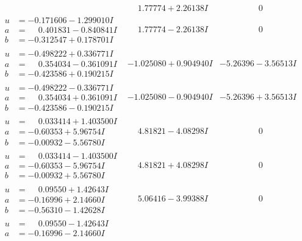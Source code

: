 \documentclass[1p]{elsarticle_modified}
\theoremstyle{definition}
\begin{document}
$$\begin{array}{c|c|c}
 & \phantom{-}1.77774 + 2.26138 I & \phantom{-0.000000 } 0 \\ \hline\begin{aligned}
u &= -0.171606 - 1.299010 I \\
a &= \phantom{-}0.401831 - 0.840841 I \\
b &= -0.312547 + 0.178701 I\end{aligned}
 & \phantom{-}1.77774 - 2.26138 I & \phantom{-0.000000 } 0 \\ \hline\begin{aligned}
u &= -0.498222 + 0.336771 I \\
a &= \phantom{-}0.354034 - 0.361091 I \\
b &= -0.423586 + 0.190215 I\end{aligned}
 & -1.025080 + 0.904940 I & -5.26396 - 3.56513 I \\ \hline\begin{aligned}
u &= -0.498222 - 0.336771 I \\
a &= \phantom{-}0.354034 + 0.361091 I \\
b &= -0.423586 - 0.190215 I\end{aligned}
 & -1.025080 - 0.904940 I & -5.26396 + 3.56513 I \\ \hline\begin{aligned}
u &= \phantom{-}0.033414 + 1.403500 I \\
a &= -0.60353 + 5.96754 I \\
b &= -0.00932 - 5.56780 I\end{aligned}
 & \phantom{-}4.81821 - 4.08298 I & \phantom{-0.000000 } 0 \\ \hline\begin{aligned}
u &= \phantom{-}0.033414 - 1.403500 I \\
a &= -0.60353 - 5.96754 I \\
b &= -0.00932 + 5.56780 I\end{aligned}
 & \phantom{-}4.81821 + 4.08298 I & \phantom{-0.000000 } 0 \\ \hline\begin{aligned}
u &= \phantom{-}0.09550 + 1.42643 I \\
a &= -0.16996 + 2.14660 I \\
b &= -0.56310 - 1.42628 I\end{aligned}
 & \phantom{-}5.06416 - 3.99388 I & \phantom{-0.000000 } 0 \\ \hline\begin{aligned}
u &= \phantom{-}0.09550 - 1.42643 I \\
a &= -0.16996 - 2.14660 I \\

\end{aligned}
\end{array}$$
\end{document}
